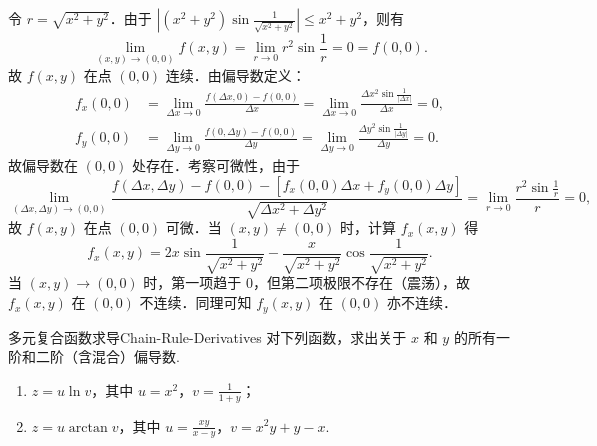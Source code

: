 \begin{myproof}
    令 $r = \sqrt{x^2 + y^2}$．由于 $\left| (x^2 + y^2) \sin \frac{1}{\sqrt{x^2+y^2}} \right| \le x^2 + y^2$，则有
    \begin{equation}
        \lim_{(x,y) \to (0,0)} f(x,y) = \lim_{r \to 0} r^2 \sin \frac{1}{r} = 0 = f(0,0).
    \end{equation}
    故 $f(x,y)$ 在点 $(0,0)$ 连续．由偏导数定义：
    \begin{equation}
        \begin{aligned}
            f_x(0,0) & = \lim_{\Delta x \to 0} \frac{f(\Delta x, 0) - f(0,0)}{\Delta x} = \lim_{\Delta x \to 0} \frac{\Delta x^2 \sin \frac{1}{|\Delta x|}}{\Delta x} = 0, \\
            f_y(0,0) & = \lim_{\Delta y \to 0} \frac{f(0, \Delta y) - f(0,0)}{\Delta y} = \lim_{\Delta y \to 0} \frac{\Delta y^2 \sin \frac{1}{|\Delta y|}}{\Delta y} = 0.
        \end{aligned}
    \end{equation}
    故偏导数在 $(0,0)$ 处存在．考察可微性，由于
    \begin{equation}
        \lim_{(\Delta x, \Delta y) \to (0,0)} \frac{f(\Delta x, \Delta y) - f(0,0) - [f_x(0,0) \Delta x + f_y(0,0) \Delta y]}{\sqrt{\Delta x^2 + \Delta y^2}} = \lim_{r \to 0} \frac{r^2 \sin \frac{1}{r}}{r} = 0,
    \end{equation}
    故 $f(x,y)$ 在点 $(0,0)$ 可微．当 $(x,y) \neq (0,0)$ 时，计算 $f_x(x,y)$ 得
    \begin{equation}
        f_x(x,y) = 2x \sin \frac{1}{\sqrt{x^2 + y^2}} - \frac{x}{\sqrt{x^2 + y^2}} \cos \frac{1}{\sqrt{x^2 + y^2}}.
    \end{equation}
    当 $(x,y) \to (0,0)$ 时，第一项趋于 $0$，但第二项极限不存在（震荡），故 $f_x(x,y)$ 在 $(0,0)$ 不连续．同理可知 $f_y(x,y)$ 在 $(0,0)$ 亦不连续．
\end{myproof}

\begin{problem}{多元复合函数求导}{Chain-Rule-Derivatives}
    对下列函数，求出关于 $x$ 和 $y$ 的所有一阶和二阶（含混合）偏导数.
    \begin{enumerate}
        \item $z = u \ln v$，其中 $u = x^2$，$v = \frac{1}{1+y}$；
        \item $z = u \arctan v$，其中 $u = \frac{xy}{x-y}$，$v = x^2y + y - x$.
    \end{enumerate}
\end{problem}

